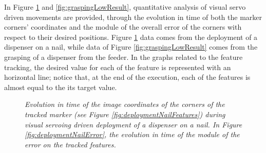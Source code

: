 In Figure \ref{fig:deploymentNailResult} and \ref{fig:graspingLowResult}, quantitative analysis of visual servo driven movements are provided, through the evolution in time of both the marker corners' coordinates and the module of the overall error of the corners with respect to their desired positions. Figure \ref{fig:deploymentNailResult} data comes from the deployment of a dispenser on a nail, while data of Figure \ref{fig:graspingLowResult} comes from the grasping of a dispenser from the feeder. In the graphs related to the feature tracking, the desired value for each of the feature is represented with an horizontal line; notice that, at the end of the execution, each of the features is almost equal to the its target value.


\begin{figure}
	\centering
	\caption{\textit{Evolution in time of the image coordinates of the corners of the tracked marker (see Figure \ref{fig:deploymentNailFeatures}) during visual servoing driven deployment of a dispenser on a nail. In Figure \ref{fig:deploymentNailError}, the evolution in time of the module of the error on the tracked features.}}
	\label{fig:deploymentNailResult}
\end{figure}

